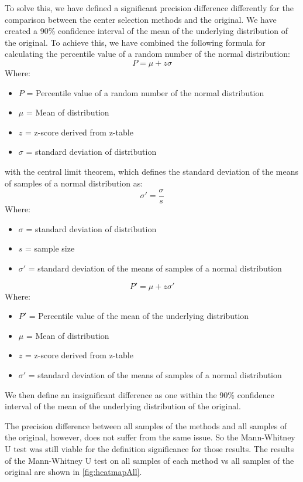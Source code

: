 \documentclass[twoside]{uva-inf-bachelor-thesis}
\begin{document}
To solve this, we have defined a significant precision difference differently for the comparison between the center selection methods and the original. We have created a 90\% confidence interval of the mean of the underlying distribution of the original. To achieve this, we have combined the following formula for calculating the percentile value of a random number of the normal distribution:
\[P = \mu + z\sigma\]
Where:
\begin{itemize}
    \item $P$ = Percentile value of a random number of the normal distribution
    \item $\mu$ = Mean of distribution
    \item $z$ = z-score derived from z-table~\cite{ztable}
    \item $\sigma$ = standard deviation of distribution
\end{itemize}
with the central limit theorem, which defines the standard deviation of the means of samples of a normal distribution as:
\[\sigma' = \frac{\sigma}{s}\]
Where:
\begin{itemize}
    \item $\sigma$ = standard deviation of distribution
    \item $s$ = sample size
    \item $\sigma'$ = standard deviation of the means of samples of a normal distribution
\end{itemize}
\[P' = \mu + z\sigma'\]
Where:
\begin{itemize}
    \item $P'$ = Percentile value of the mean of the underlying distribution
    \item $\mu$ = Mean of distribution
    \item $z$ = z-score derived from z-table~\cite{ztable}
    \item $\sigma'$ = standard deviation of the means of samples of a normal distribution
\end{itemize}
We then define an insignificant difference as one within the 90\% confidence interval of the mean of the underlying distribution of the original.

The precision difference between all samples of the methods and all samples of the original, however, does not suffer from the same issue. So the Mann-Whitney U test was still viable for the definition significance for those results. The results of the Mann-Whitney U test on all samples of each method vs all samples of the original are shown in \ref{fig:heatmapAll}.
\end{document}
